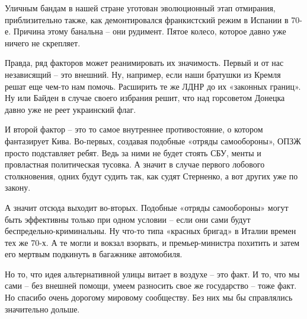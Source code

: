 Уличным бандам в нашей стране уготован эволюционный этап отмирания,
приблизительно также, как демонтировался франкистский режим в Испании в 70-е.
Причина этому банальна – они рудимент. Пятое колесо, которое давно уже ничего
не скрепляет.

Правда, ряд факторов может реанимировать их значимость. Первый и от нас
независящий – это внешний. Ну, например, если наши братушки из Кремля решат еще
чем-то нам помочь. Расширить те же ЛДНР до их «законных границ». Ну или Байден
в случае своего избрания решит, что над горсоветом Донецка давно уже не реет
украинский флаг.

И второй фактор – это то самое внутреннее противостояние, о котором фантазирует
Кива. Во-первых, создавая подобные «отряды самообороны», ОПЗЖ просто
подставляет ребят. Ведь за ними не будет стоять СБУ, менты и провластная
политическая тусовка. А значит в случае первого лобового столкновения, одних
будут судить так, как судят Стерненко, а вот других уже по закону.

А значит отсюда выходит во-вторых. Подобные «отряды самообороны» могут быть
эффективны только при одном условии – если они сами будут
беспредельно-криминальны. Ну что-то типа «красных бригад» в Италии времен тех
же 70-х. А те могли и вокзал взорвать, и премьер-министра похитить и затем его
мертвым подкинуть в багажнике автомобиля.

Но то, что идея альтернативной улицы витает в воздухе – это факт. И то, что мы
сами – без внешней помощи, умеем разносить свое же государство – тоже факт. Но
спасибо очень дорогому мировому сообществу. Без них мы бы справлялись
значительно дольше.

